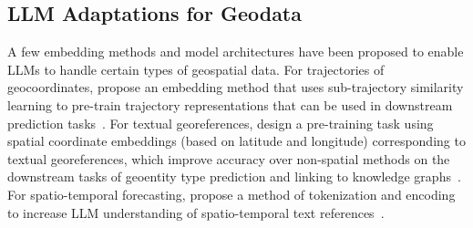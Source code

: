 



\subsection{LLM Adaptations for Geodata}
A few embedding methods and model architectures have been proposed to enable LLMs to handle certain types of geospatial data.
%
For trajectories of geocoordinates, \citeauthor{Hu2023} propose an embedding method that uses sub-trajectory similarity learning to pre-train trajectory representations that can be used in downstream prediction tasks~\cite{Hu2023}.
%
For textual georeferences, \citeauthor{Li2021} design a pre-training task using spatial coordinate embeddings (based on latitude and longitude) corresponding to textual georeferences, which improve
 accuracy over non-spatial methods on the downstream tasks of geoentity type prediction and linking to knowledge graphs~\cite{Li2021}.
For spatio-temporal forecasting, \citeauthor{Liu2024large} propose a method of tokenization and encoding to increase LLM understanding of spatio-temporal text references~\cite{Liu2024large}.





 









